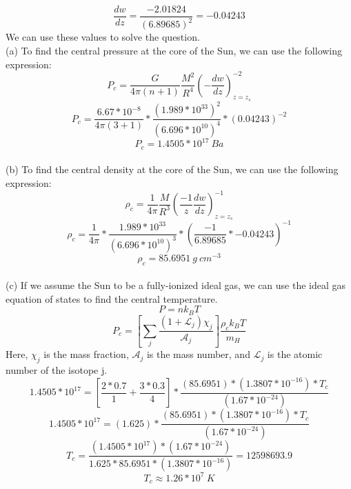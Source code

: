 \documentclass[10pt]{article}
\begin{document}
\begin{equation}
    \frac{dw}{dz} = \frac{-2.01824}{(6.89685)^{2}} = -0.04243
\end{equation}
We can use these values to solve the question.\\
(a) To find the central pressure at the core of the Sun, we can use the following expression:
\[ P_{c} = \frac{G}{4 \pi (n + 1)} \frac{M^2}{R^4} \left(- \frac{dw}{dz}\right)^{-2}_{z = z_{s}}\]
\[ P_{c} = \frac{6.67 * 10^{-8}}{4 \pi (3 + 1)}  * \frac{(1.989 * 10^{33})^2}{(6.696 * 10^{10})^4}  * (0.04243)^{-2}\]
\[ P_{c} = 1.4505 * 10^{17} \ Ba\] \\
(b) To find the central density at the core of the Sun, we can use the following expression:
\[ \rho_{c} = \frac{1}{4 \pi} \frac{M}{R^3} \left( \frac{-1}{z} \frac{dw}{dz}\right)^{-1}_{z = z_{s}}\]
\[ \rho_{c} = \frac{1}{4 \pi} * \frac{1.989 * 10^{33}}{(6.696 * 10^{10})^3} * \left( \frac{-1}{6.89685} * -0.04243\right)^{-1}\]
\[ \rho_{c} = 85.6951 \  g  \ cm^{-3}\] \\
(c) If we assume the Sun to be a fully-ionized ideal gas, we can use the ideal gas equation of states to find the central temperature.
\[ P = n k_{B} T\]
\[ P_{c} = \left[ \sum_{j} \frac{(1 + \mathscr{L}_j ) \chi_{j}}{\mathcal{A}_{j}} \right] \frac{\rho_{c} k_{B} T}{m_{H}}\]
Here, $\chi_{j}$ is the mass fraction, $\mathcal{A}_{j}$ is the mass number, and $\mathscr{L}_j$ is the atomic number of the isotope j.
\[ 1.4505 * 10^{17} = \left[ \frac{2* 0.7}{1} + \frac{3 * 0.3}{4}\right] * \frac{(85.6951)*(1.3807 * 10^{-16}) * T_{c}}{(1.67 * 10^{-24})}\]
\[ 1.4505 * 10^{17} = (1.625) * \frac{(85.6951)*(1.3807 * 10^{-16}) * T_{c}}{(1.67 * 10^{-24})} \]
\[ T_{c} = \frac{(1.4505 * 10^{17}) * (1.67 * 10^{-24})}{1.625 * 85.6951 * (1.3807 * 10^{-16})} = 12598693.9\]
\[ T_{c} \approx 1.26 * 10^7 \ K \]
\end{document}
